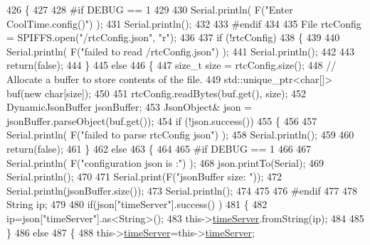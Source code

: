 \begin{DoxyCode}
426 \{
427 
428 \textcolor{preprocessor}{#if DEBUG == 1 }
429 
430     Serial.println( F(\textcolor{stringliteral}{"Enter CoolTime.config()"}) );
431     Serial.println();
432 
433 \textcolor{preprocessor}{#endif }
434 
435     File rtcConfig = SPIFFS.open(\textcolor{stringliteral}{"/rtcConfig.json"}, \textcolor{stringliteral}{"r"});
436 
437     \textcolor{keywordflow}{if} (!rtcConfig) 
438     \{
439     
440         Serial.println( F(\textcolor{stringliteral}{"failed to read /rtcConfig.json"}) );
441         Serial.println();
442 
443         \textcolor{keywordflow}{return}(\textcolor{keyword}{false});
444     \}
445     \textcolor{keywordflow}{else}
446     \{
447         \textcolor{keywordtype}{size\_t} size = rtcConfig.size();
448         \textcolor{comment}{// Allocate a buffer to store contents of the file.}
449         std::unique\_ptr<char[]> buf(\textcolor{keyword}{new} \textcolor{keywordtype}{char}[size]);
450 
451         rtcConfig.readBytes(buf.get(), size);
452         DynamicJsonBuffer jsonBuffer;
453         JsonObject& json = jsonBuffer.parseObject(buf.get());
454         \textcolor{keywordflow}{if} (!json.success()) 
455         \{
456 
457             Serial.println( F(\textcolor{stringliteral}{"failed to parse rtcConfig json"}) );
458             Serial.println();
459 
460             \textcolor{keywordflow}{return}(\textcolor{keyword}{false});
461         \} 
462         \textcolor{keywordflow}{else}
463         \{  
464         
465 \textcolor{preprocessor}{        #if DEBUG == 1 }
466 
467             Serial.println( F(\textcolor{stringliteral}{"configuration json is :"}) );
468             json.printTo(Serial);
469             Serial.println();
470 
471             Serial.print(F(\textcolor{stringliteral}{"jsonBuffer size: "}));
472             Serial.println(jsonBuffer.size());
473             Serial.println();
474 
475 
476 \textcolor{preprocessor}{        #endif}
477 
478             String ip;
479             
480             \textcolor{keywordflow}{if}(json[\textcolor{stringliteral}{"timeServer"}].success() )
481             \{           
482                  ip=json[\textcolor{stringliteral}{"timeServer"}].as<String>();
483                 this->\hyperlink{class_cool_time_ad2b9858f399108cb440dd1e908916f04}{timeServer}.fromString(ip);
484                 
485             \}
486             \textcolor{keywordflow}{else}
487             \{
488                 this->\hyperlink{class_cool_time_ad2b9858f399108cb440dd1e908916f04}{timeServer}=this->\hyperlink{class_cool_time_ad2b9858f399108cb440dd1e908916f04}{timeServer};

\end{DoxyCode}

